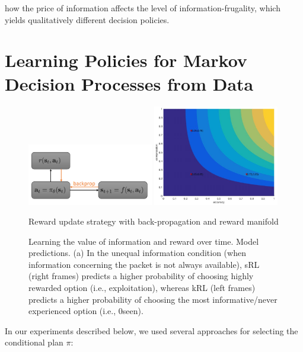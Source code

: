 \documentclass[letterpaper, 10pt, conference]{IEEEtran} %
\begin{document}
how the price of information affects the level of information-frugality,
which yields qualitatively different decision policies.


\section{Learning Policies for Markov Decision Processes from Data}
  \begin{figure}
    \centering
    \includegraphics[width=0.49\textwidth]{images/Backprop.PNG}
      \includegraphics[width=0.49\textwidth]{images/reward_manifold.JPG}
\caption{Reward update strategy with back-propagation and reward manifold}
    \label{fig:moq}
  \end{figure}

  \begin{figure} 
    \centering
\caption{Learning the value of information and reward over time. Model predictions. (a) In the unequal information condition (when information concerning the packet is not always available), sRL (right frames) predicts a higher probability of choosing highly rewarded option (i.e., exploitation), whereas kRL (left frames) predicts a higher probability of choosing the most informative/never experienced option (i.e., 0seen).  }
    \label{fig:value}
  \end{figure}

In our experiments described below, we used several approaches for selecting the conditional plan $\pi$:
\end{document}
